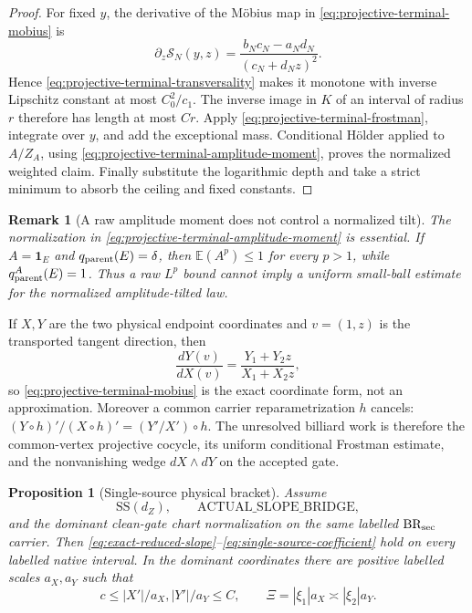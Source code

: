 \documentclass[11pt]{article}
\newtheorem{proposition}[theorem]{Proposition}
\newtheorem{remark}[theorem]{Remark}
\newcommand{\one}{\mathbf 1}
\begin{document}
\begin{proof}
For fixed $y$, the derivative of the M\"obius map in
\eqref{eq:projective-terminal-mobius} is
\[
 \partial_z\mathscr S_N(y,z)
 =\frac{b_Nc_N-a_Nd_N}{(c_N+d_Nz)^2}.
\]
Hence \eqref{eq:projective-terminal-transversality} makes it monotone with
inverse Lipschitz constant at most $C_0^2/c_1$.  The inverse image in $K$
of an interval of radius $r$ therefore has length at most $Cr$.
Apply \eqref{eq:projective-terminal-frostman}, integrate over $y$, and add
the exceptional mass.  Conditional H\"older applied to $A/Z_A$, using
\eqref{eq:projective-terminal-amplitude-moment}, proves the normalized
weighted claim.
Finally substitute the logarithmic depth and take a strict minimum to
absorb the ceiling and fixed constants.
\end{proof}

\begin{remark}[A raw amplitude moment does not control a normalized tilt]
\label{rem:normalized-amplitude-moment-necessary}
The normalization in
\eqref{eq:projective-terminal-amplitude-moment} is essential.  If
$A=\one_E$ and $q_{\rm parent}(E)=\delta$, then
$\mathbb E(A^p)\le1$ for every $p>1$, while
$q_{\rm parent}^A(E)=1$.  Thus a raw $L^p$ bound cannot imply a uniform
small-ball estimate for the normalized amplitude-tilted law.
\end{remark}

If $X,Y$ are the two physical endpoint coordinates and $v=(1,z)$ is the
transported tangent direction, then
\[
 \frac{dY(v)}{dX(v)}
 =\frac{Y_1+Y_2z}{X_1+X_2z},
\]
so \eqref{eq:projective-terminal-mobius} is the exact coordinate form, not
an approximation.  Moreover a common carrier reparametrization $h$ cancels:
$(Y\circ h)'/(X\circ h)'=(Y'/X')\circ h$.  The unresolved billiard work is
therefore the common-vertex projective cocycle, its uniform conditional
Frostman estimate, and the nonvanishing wedge
$dX\wedge dY$ on the accepted gate.

\begin{proposition}[Single-source physical bracket]
\label{prop:exact-reduced-slope}
Assume
\[
 \mathrm{SS}(d_Z),\qquad
 \mathrm{ACTUAL\_SLOPE\_BRIDGE},
\]
and the dominant clean-gate chart normalization on the same labelled
$\mathrm{BR}_{\rm sec}$ carrier.  Then
\eqref{eq:exact-reduced-slope}--\eqref{eq:single-source-coefficient} hold on
every labelled native interval.  In the dominant coordinates there are
positive labelled scales $a_X,a_Y$ such that
\begin{equation}
\label{eq:dominant-coordinate-normalization}
 c\le |X'|/a_X,|Y'|/a_Y\le C,
 \qquad \Xi=|\xi_1|a_X\asymp|\xi_2|a_Y.
\end{equation}
\end{proposition}
\end{document}

